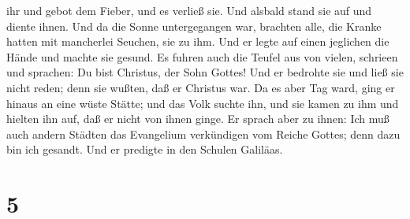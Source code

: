 ihr und gebot dem Fieber, und es verließ sie. Und alsbald stand sie auf
und diente ihnen.  Und da die Sonne untergegangen war,
brachten alle, die Kranke hatten mit mancherlei Seuchen, sie zu ihm. Und
er legte auf einen jeglichen die Hände und machte sie gesund.
 Es fuhren auch die Teufel aus von vielen, schrieen und
sprachen: Du bist Christus, der Sohn Gottes! Und er bedrohte sie und
ließ sie nicht reden; denn sie wußten, daß er Christus war.
 Da es aber Tag ward, ging er hinaus an eine wüste Stätte;
und das Volk suchte ihn, und sie kamen zu ihm und hielten ihn auf, daß
er nicht von ihnen ginge.  Er sprach aber zu ihnen: Ich muß
auch andern Städten das Evangelium verkündigen vom Reiche Gottes; denn
dazu bin ich gesandt.  Und er predigte in den Schulen
Galiläas.

\hypertarget{section-4}{%
\section{5}\label{section-4}}

